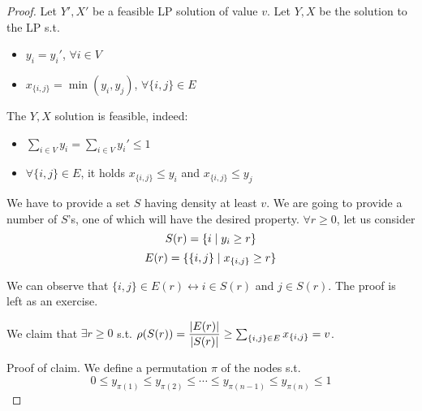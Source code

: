    \begin{proof}
        Let $Y', X'$ be a feasible LP solution of value $v$.
        Let $Y, X$ be the solution to the LP s.t.
        \begin{itemize}
            \item $y_i = y_i'$, $\forall i \in V$
            \item $x_{\{i,j\}} = \min(y_i,y_j)$, $\forall \{i,j\} \in E$
        \end{itemize}

        The $Y,X$ solution is feasible, indeed:
        \begin{itemize}
            \item $\sum_{i \in V} y_i = \sum_{i \in V} y_i' \leq 1$
            \item $\forall \{i,j\} \in E$, it holds $x_{\{i,j\}} \leq y_i$ and $x_{\{i,j\}} \leq y_j$
        \end{itemize}

        We have to provide a set $S$ having density at least $v$.
        We are going to provide a number of $S$'s, one of which will have the desired property.
        $\forall r \geq 0$, let us consider
        \[ S(r) = \{ i \; \vert \; y_i \geq r \} \]
        \[ E(r) = \{ \{i,j\} \; \vert \; x_{\{i,j\}} \geq r \} \]

        We can observe that $\{i,j\} \in E(r) \leftrightarrow i \in S(r)$ and $j \in S(r)$.
        The proof is left as an exercise.

        We claim that $\exists r \geq 0$ s.t. $\rho(S(r)) = \dfrac{\vert E(r) \vert}{\vert S(r) \vert} \geq \sum_{\{i,j\} \in E} x_{\{i,j\}} = v$.

        Proof of claim. We define a permutation $\pi$ of the nodes s.t.
        \[ 0 \leq y_{\pi(1)} \leq y_{\pi(2)} \leq \cdots \leq y_{\pi(n-1)} \leq y_{\pi(n)} \leq 1 \]



\end{proof}
